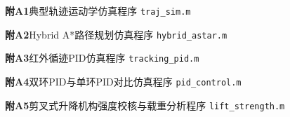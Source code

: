 \noindent \textbf{附A1}\quad 典型轨迹运动学仿真程序 \texttt{traj\_sim.m}



\vspace{1em}

\noindent \textbf{附A2}\quad Hybrid A*路径规划仿真程序 \texttt{hybrid\_astar.m}



\vspace{1em}

\noindent \textbf{附A3}\quad 红外循迹PID仿真程序 \texttt{tracking\_pid.m}



\vspace{1em}

\noindent \textbf{附A4}\quad 双环PID与单环PID对比仿真程序 \texttt{pid\_control.m}



\vspace{1em}

\noindent \textbf{附A5}\quad 剪叉式升降机构强度校核与载重分析程序 \texttt{lift\_strength.m}





